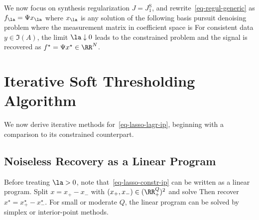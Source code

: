 We now focus on synthesis regularization $J=J_1^{\text{S}}$, and rewrite~\eqref{eq-regul-generic} as $f_\la = \Psi x_\la$ where $x_\la$ is any solution of the following basis pursuit denoising problem
where the measurement matrix in coefficient space is
For consistent data $y\in\Im(A)$, the limit $\la\downarrow0$ leads to the constrained problem
and the signal is recovered as $f^\star=\Psi x^\star \in \RR^N$.


                                                                                                                                                                  



 
                                                                
                                                                
                                                                
\section{Iterative Soft Thresholding Algorithm}
\label{subsec-proximal-ip}

We now derive iterative methods for~\eqref{eq-lasso-lagr-ip}, beginning with a comparison to its constrained counterpart.

                                                                
\subsection{Noiseless Recovery as a Linear Program}
\label{eq-linearprog-lasso}

Before treating $\la>0$, note that~\eqref{eq-lasso-constr-ip} can be written as a linear program. Split $x=x_+-x_-$ with $(x_+,x_-)\in(\RR_+^Q)^2$ and solve
Then recover $x^\star=x_+^\star-x_-^\star$. For small or moderate $Q$, the linear program can be solved by simplex or interior-point methods.
 
